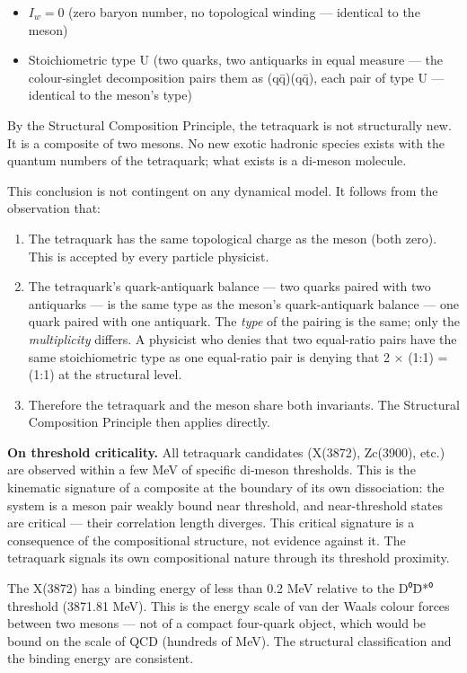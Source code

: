 \documentclass[12pt,a4paper]{article}
\begin{document}
\begin{itemize}
\tightlist
\item
  \(I_w = 0\) (zero baryon number, no topological winding --- identical
  to the meson)
\item
  Stoichiometric type U (two quarks, two antiquarks in equal measure ---
  the colour-singlet decomposition pairs them as (qq̄)(qq̄), each pair of
  type U --- identical to the meson's type)
\end{itemize}

By the Structural Composition Principle, the tetraquark is not
structurally new. It is a composite of two mesons. No new exotic
hadronic species exists with the quantum numbers of the tetraquark; what
exists is a di-meson molecule.

This conclusion is not contingent on any dynamical model. It follows
from the observation that:

\begin{enumerate}
\def\labelenumi{\arabic{enumi}.}
\tightlist
\item
  The tetraquark has the same topological charge as the meson (both
  zero). This is accepted by every particle physicist.
\item
  The tetraquark's quark-antiquark balance --- two quarks paired with
  two antiquarks --- is the same type as the meson's
  quark-antiquark balance --- one quark paired with one antiquark. The
  \emph{type} of the pairing is the same; only the \emph{multiplicity}
  differs. A physicist who denies that two equal-ratio pairs have the
  same stoichiometric type as one equal-ratio pair is denying that 2 ×
  (1:1) = (1:1) at the structural level.
\item
  Therefore the tetraquark and the meson share both invariants. The Structural Composition Principle then applies
  directly.
\end{enumerate}

\textbf{On threshold criticality.} All tetraquark candidates (X(3872),
Zc(3900), etc.) are observed within a few MeV of specific di-meson
thresholds. This is the kinematic signature of a composite at the
boundary of its own dissociation: the system is a meson pair weakly
bound near threshold, and near-threshold states are critical --- their
correlation length diverges. This critical signature is a consequence of
the compositional structure, not evidence against it. The tetraquark
signals its own compositional nature through its threshold proximity.

The X(3872) has a binding energy of less than 0.2 MeV relative to the
D⁰D̄*⁰ threshold (3871.81 MeV). This is the energy scale of van der Waals
colour forces between two mesons --- not of a compact four-quark object,
which would be bound on the scale of QCD (hundreds of MeV). The
structural classification and the binding energy are consistent.
\end{document}

